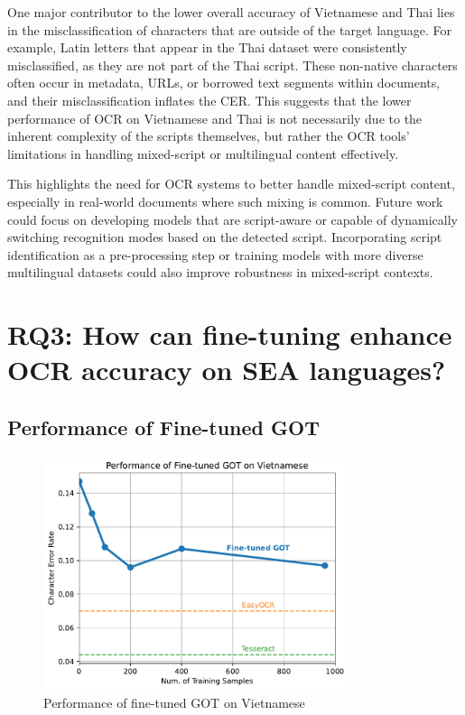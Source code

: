 \documentclass[12pt,oneside]{memoir}
\begin{document}
One major contributor to the lower overall accuracy of Vietnamese and Thai lies in the misclassification of characters that are outside of the target language. 
For example, Latin letters that appear in the Thai dataset were consistently misclassified, as they are not part of the Thai script.
These non-native characters often occur in metadata, URLs, or borrowed text segments within documents, and their misclassification inflates the CER. 
This suggests that the lower performance of OCR on Vietnamese and Thai is not necessarily due to the inherent complexity of the scripts themselves, but rather the OCR tools’ limitations in handling mixed-script or multilingual content effectively.

This highlights the need for OCR systems to better handle mixed-script content, especially in real-world documents where such mixing is common. Future work could focus on developing models that are script-aware or capable of dynamically switching recognition modes based on the detected script. Incorporating script identification as a pre-processing step or training models with more diverse multilingual datasets could also improve robustness in mixed-script contexts.

\section{RQ3: How can fine-tuning enhance OCR accuracy on SEA languages?}

\subsection{Performance of Fine-tuned GOT}

\begin{figure}[ht]
    \centering
    \includegraphics[width=0.8\textwidth]{images/fine-tuned-got-vietnamese.pdf}
    \caption{Performance of fine-tuned GOT on Vietnamese}
    \label{figure:fine-tuned-got-vietnamese}
\end{figure}
\end{document}

